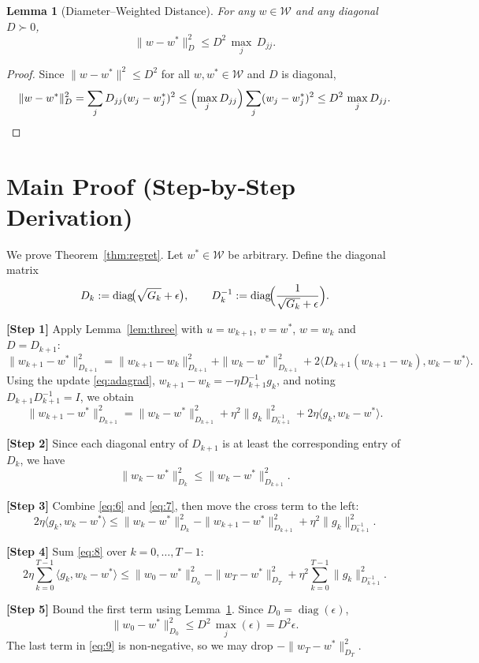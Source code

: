 \documentclass{article}
\newtheorem{lemma}{Lemma}
\newcommand{\inner}[2]{\langle #1,#2\rangle}
\begin{document}
\begin{lemma}[Diameter–Weighted Distance]\label{lem:diam}
For any $w\in\mathcal{W}$ and any diagonal $D\succ0$,
\[
\|w-w^{*}\|_{D}^{2}\le D^{2}\,\max_{j}\,D_{jj}.
\]
\end{lemma}
\begin{proof}
Since $\|w-w^{*}\|^{2}\le D^{2}$ for all $w,w^{*}\in\mathcal{W}$ and $D$ is diagonal,
\[
\|w-w^{*}\|_{D}^{2}= \sum_{j} D_{jj}(w_{j}-w^{*}_{j})^{2}
\le \Bigl(\max_{j}D_{jj}\Bigr)\sum_{j}(w_{j}-w^{*}_{j})^{2}
\le D^{2}\,\max_{j}D_{jj}. \qedhere
\]
\end{proof}

\section*{Main Proof (Step‑by‑Step Derivation)}
We prove Theorem~\ref{thm:regret}. Let $w^{*}\in\mathcal{W}$ be arbitrary. Define the diagonal matrix
\[
D_{k}:=\operatorname{diag}\!\bigl(\sqrt{G_{k}}+\epsilon\bigr),\qquad
D_{k}^{-1}:=\operatorname{diag}\!\Bigl(\frac{1}{\sqrt{G_{k}}+\epsilon}\Bigr).
\]

\noindent\textbf{[Step 1]} Apply Lemma~\ref{lem:three} with $u=w_{k+1}$, $v=w^{*}$, $w=w_{k}$ and $D=D_{k+1}$:
\[
\|w_{k+1}-w^{*}\|_{D_{k+1}}^{2}
= \|w_{k+1}-w_{k}\|_{D_{k+1}}^{2}
+ \|w_{k}-w^{*}\|_{D_{k+1}}^{2}
+2\inner{D_{k+1}(w_{k+1}-w_{k})}{w_{k}-w^{*}}.
\]
Using the update \eqref{eq:adagrad},
$w_{k+1}-w_{k}= -\eta D_{k+1}^{-1}g_{k}$,
and noting $D_{k+1}D_{k+1}^{-1}=I$, we obtain
\[
\|w_{k+1}-w^{*}\|_{D_{k+1}}^{2}
= \|w_{k}-w^{*}\|_{D_{k+1}}^{2}
+\eta^{2}\|g_{k}\|_{D_{k+1}^{-1}}^{2}
+2\eta\inner{g_{k}}{w_{k}-w^{*}}.
\tag{6}
\]

\noindent\textbf{[Step 2]} Since each diagonal entry of $D_{k+1}$ is at least the corresponding entry of $D_{k}$, we have
\[
\|w_{k}-w^{*}\|_{D_{k}}^{2}\le\|w_{k}-w^{*}\|_{D_{k+1}}^{2}.
\tag{7}
\]

\noindent\textbf{[Step 3]} Combine \eqref{eq:6} and \eqref{eq:7}, then move the cross term to the left:
\[
2\eta\inner{g_{k}}{w_{k}-w^{*}}
\le \|w_{k}-w^{*}\|_{D_{k}}^{2}
-\|w_{k+1}-w^{*}\|_{D_{k+1}}^{2}
+\eta^{2}\|g_{k}\|_{D_{k+1}^{-1}}^{2}.
\tag{8}
\]

\noindent\textbf{[Step 4]} Sum \eqref{eq:8} over $k=0,\dots,T-1$:
\[
2\eta\sum_{k=0}^{T-1}\inner{g_{k}}{w_{k}-w^{*}}
\le \|w_{0}-w^{*}\|_{D_{0}}^{2}
-\|w_{T}-w^{*}\|_{D_{T}}^{2}
+\eta^{2}\sum_{k=0}^{T-1}\|g_{k}\|_{D_{k+1}^{-1}}^{2}.
\tag{9}
\]

\noindent\textbf{[Step 5]} Bound the first term using Lemma~\ref{lem:diam}. Since $D_{0}=\operatorname{diag}(\epsilon)$,
\[
\|w_{0}-w^{*}\|_{D_{0}}^{2}
\le D^{2}\,\max_{j}(\epsilon)=D^{2}\epsilon .
\tag{10}
\]
The last term in \eqref{eq:9} is non‑negative, so we may drop $-\|w_{T}-w^{*}\|_{D_{T}}^{2}$.
\end{document}
